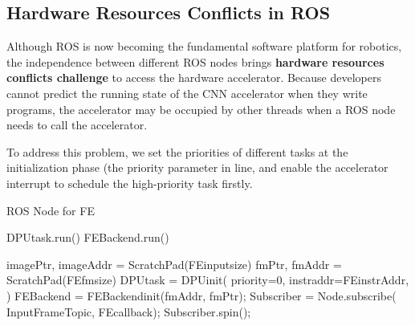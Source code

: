  

\subsection{Hardware Resources Conflicts in ROS}

Although ROS is now becoming the fundamental software platform for robotics, the independence between different ROS nodes brings \textbf{hardware resources conflicts challenge} to access the hardware accelerator. 
Because developers cannot predict the running state of the CNN accelerator when they write programs, the accelerator may be occupied by other threads when a ROS node needs to call the accelerator.

To address this problem, we set the priorities of different tasks at the initialization phase (the {\color{red}priority} parameter in   line, and enable the accelerator interrupt to schedule the high-priority task firstly.



\begin{algorithm}[t]
    \caption{ ROS Node for FE }
    \label{code:FE}
    \begin{algorithmic}[1]
        \State DPUtask.run()
        \State FEBackend.run()
        \EndFunction

        \State imagePtr, imageAddr = ScratchPad(FEinputsize)
        \State fmPtr, fmAddr = ScratchPad(FEfmsize)
        \State DPUtask = DPUinit({\color{red}  priority=0},{\color{blue} instraddr=FEinstrAddr, }
        \State \qquad \qquad \qquad {} ) 
        \State FEBackend = FEBackendinit({\color{blue}fmAddr, fmPtr});
        \State Subscriber = Node.subscribe( InputFrameTopic, FEcallback);
        \State Subscriber.spin();
        \EndFunction
    \end{algorithmic}
\end{algorithm}

